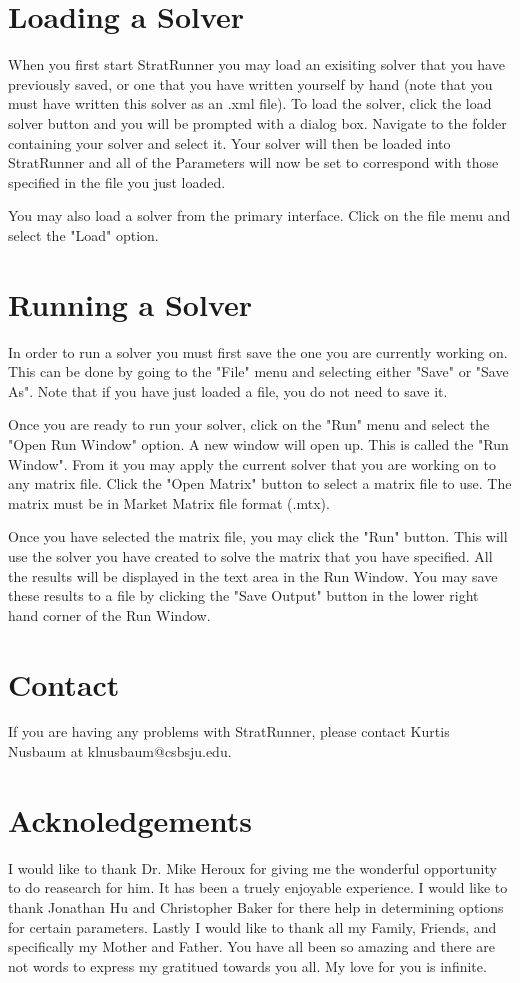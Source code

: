 \documentclass{article}
\begin{document}
\section{Loading a Solver}

When you first start StratRunner you may load an exisiting solver that you have previously saved, or one that you have written yourself by hand (note
that you must have written this solver as an .xml file). To load the solver, click the load solver button and you will be prompted with a dialog box.
Navigate to the folder containing your solver and select it. Your solver will then be loaded into StratRunner and all of the Parameters will now be
set to correspond with those specified in the file you just loaded.

You may also load a solver from the primary interface. Click on the file menu and select the "Load" option.

\section{Running a Solver}

In order to run a solver you must first save the one you are currently working on. This can be done by going to the "File" menu and selecting
either "Save" or "Save As". Note that if you have just loaded a file, you do not need to save it.

Once you are ready to run your solver, click on the "Run" menu and select the "Open Run Window" option. A new window will open up. This is called the 
"Run Window". From it you may apply the current solver that you are working on to any matrix file. Click the "Open Matrix" button to select a matrix
file to use. The matrix must be in Market Matrix file format (.mtx).

Once you have selected the matrix file, you may click the "Run" button. This will use the solver you have created to solve the matrix that you have
specified. All the results will be displayed in the text area in the Run Window. You may save these results to a file by clicking the "Save Output"
button in the lower right hand corner of the Run Window.

\section{Contact}

If you are having any problems with StratRunner, please contact Kurtis Nusbaum at klnusbaum@csbsju.edu.

\section{Acknoledgements}

I would like to thank Dr. Mike Heroux for giving me the wonderful opportunity to do reasearch for him. It has been a truely enjoyable experience. I 
would like to thank Jonathan Hu and Christopher Baker for there help in determining options for certain parameters. Lastly I would like to thank all
my Family, Friends, and specifically my Mother and Father. You have all been so amazing and there are not words to express my gratitued towards you all.
My love for you is infinite.
\end{document}
